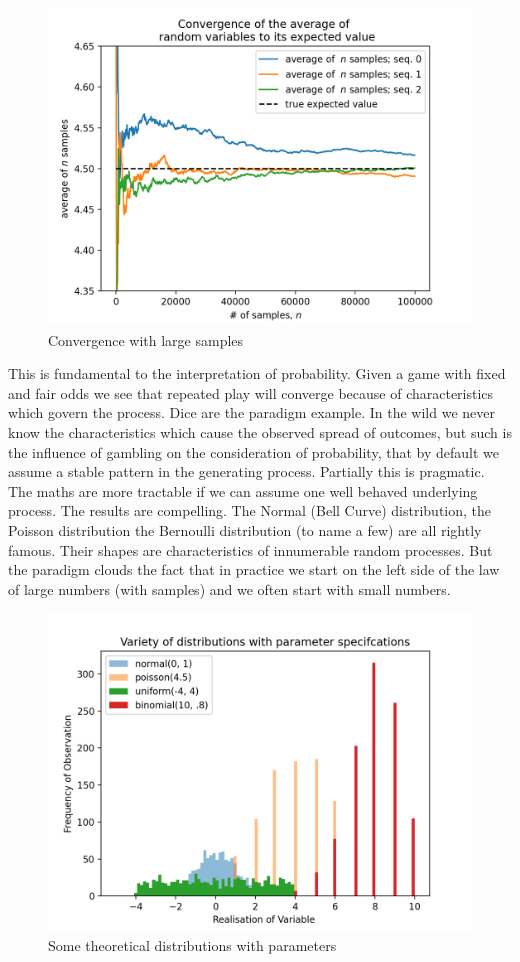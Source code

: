 \documentclass[10pt,a4paper,notitlepage, twocolumn]{article}
\begin{document}
\begin{figure}[H]
  \includegraphics[width=\linewidth]{./Plots/convergence_of_law_of_large_numbers.png}
  \caption{Convergence with large samples}
\end{figure}
\noindent  This is fundamental to the interpretation of probability. Given a game with fixed and fair odds we see that repeated play will converge because of characteristics which govern the process. Dice are the paradigm example.  In the wild we never know the characteristics which cause the observed spread of outcomes, but such is the influence of gambling on the consideration of probability, that by default we assume a stable pattern in the generating process. Partially this is pragmatic. The maths are more tractable if we can assume one well behaved underlying process. The results are compelling. The Normal (Bell Curve) distribution, the Poisson distribution the Bernoulli distribution (to name a few) are all rightly famous. Their shapes are characteristics of innumerable random processes. But the paradigm clouds the fact that in practice we start on the left side of the law of large numbers (with samples) and we often start with small numbers. 
\begin{figure}[H]
  \includegraphics[width=\linewidth]{./Plots/variety_of_distributions.png}
  \caption{Some theoretical distributions with parameters}
\end{figure}
\end{document}
